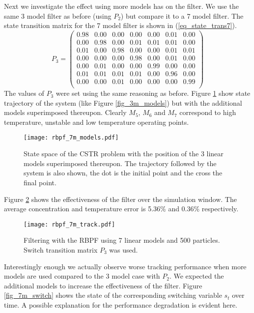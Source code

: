 Next we investigate the effect using more models has on the filter. We use the same 3 model filter as before (using $P_2$) but compare it to a 7 model filter. The state transition matrix for the 7 model filter is shown in (\ref{eq_state_trans7}).
\begin{equation}
P_3 = \begin{pmatrix}
0.98 & 0.00 & 0.00 & 0.00 & 0.00 & 0.01 & 0.00 \\
0.00 & 0.98 & 0.00 & 0.01 & 0.01 & 0.01 & 0.00 \\
0.01 & 0.00 & 0.98 & 0.00 & 0.00 & 0.01 & 0.01 \\
0.00 & 0.00 & 0.00 & 0.98 & 0.00 & 0.01 & 0.00 \\
0.00 & 0.01 & 0.00 & 0.00 & 0.99 & 0.00 & 0.00 \\
0.01 & 0.01 & 0.01 & 0.01 & 0.00 & 0.96 & 0.00 \\
0.00 & 0.00 & 0.01 & 0.00 & 0.00 & 0.00 & 0.99 \\
\end{pmatrix}
\label{eq_state_trans7}
\end{equation}
The values of $P_3$ were set using the same reasoning as before. Figure \ref{fig_7m_models} show state trajectory of the system (like Figure \ref{fig_3m_models}) but with the additional models superimposed thereupon. Clearly $M_5$, $M_6$ and $M_7$ correspond to high temperature, unstable and low temperature operating points. 
\begin{figure}[H] 
\centering
\texttt{[image: rbpf\_7m\_models.pdf]}
\caption{State space of the CSTR problem with the position of the 3 linear models superimposed thereupon. The trajectory followed by the system is also shown, the dot is the initial point and the cross the final point.}
\label{fig_7m_models}
\end{figure}
Figure \ref{fig_7m_track} shows the effectiveness of the filter over the simulation window. The average concentration and temperature error is 5.36\% and 0.36\% respectively. 
\begin{figure}[H] 
\centering
\texttt{[image: rbpf\_7m\_track.pdf]}
\caption{Filtering with the RBPF using 7 linear models and 500 particles. Switch transition matrix $P_3$ was used.}
\label{fig_7m_track}
\end{figure}
Interestingly enough we actually observe worse tracking performance when more models are used compared to the 3 model case with $P_2$. We expected the additional models to increase the effectiveness of the filter. Figure \ref{fig_7m_switch} shows the state of the corresponding switching variable $s_t$ over time. A possible explanation for the performance degradation is evident here.
